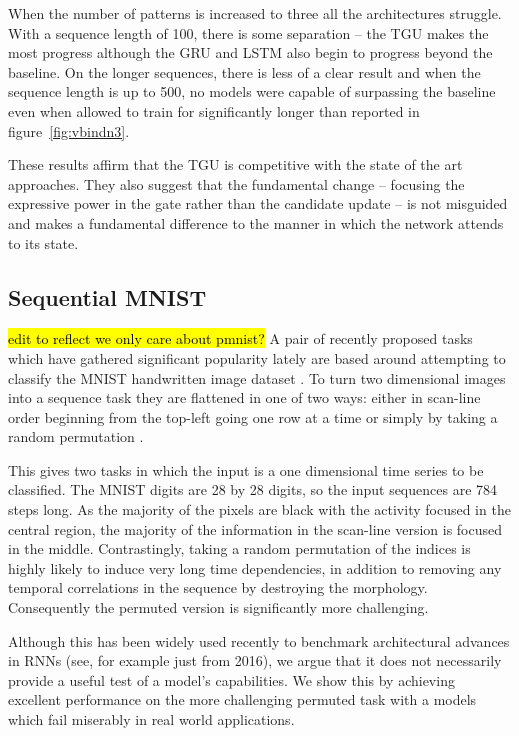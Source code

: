 When the number of patterns is increased to three all the architectures struggle.
With a sequence length of 100, there is some separation -- the TGU makes the most
progress although the GRU and LSTM also begin to progress beyond the baseline.
On the longer sequences, there is less of a clear result and when the sequence
length is up to 500, no models were capable of surpassing the baseline even when
allowed to train for significantly longer than reported in figure~\ref{fig:vbindn3}.

These results affirm that the TGU is competitive with the state of the art approaches.
They also suggest that the fundamental change -- focusing the expressive power in the
gate rather than the candidate update -- is not misguided and makes a fundamental
difference to the manner in which the network attends to its state.


\subsection{Sequential MNIST}
\hl{edit to reflect we only care about pmnist?}
A pair of recently proposed tasks which have gathered significant popularity lately
are based around attempting to classify the MNIST handwritten image dataset 
\autocite{Lecun1998}. To turn two dimensional images into a sequence task they are
flattened in one of two ways: either in scan-line order beginning from the top-left
going one row at a time or simply by taking a random permutation \autocite{Le2015}.

This gives two tasks in which the input is a one dimensional time series to be
classified. The MNIST digits are 28 by 28 digits, so the input sequences are
784 steps long. As the majority of the pixels are black with the activity focused
in the central region, the majority of the information in the scan-line version
is focused in the middle. Contrastingly, taking a random permutation of the indices
is highly likely to induce very long time dependencies, in addition to removing
any temporal correlations in the sequence by destroying the morphology. Consequently
the permuted version is significantly more challenging.

Although this has been widely used recently to benchmark architectural
advances in RNNs (see, for example 
\autocite{Zhang2016, Barone2016, Gao2016, Neyshabur2016, Cooijmans2016}
just from 2016), we argue that it does not necessarily provide a useful test of
a model's capabilities. We show this by achieving excellent performance
on the more challenging permuted task with a models which fail miserably
in real world applications. 

